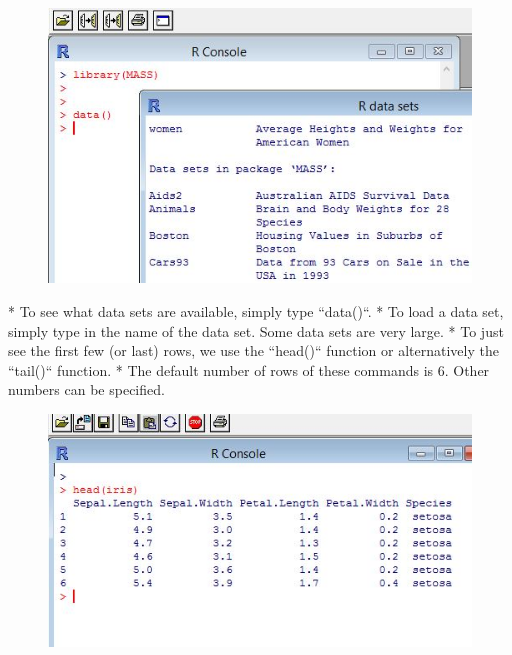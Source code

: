 \documentclass{beamer}
\begin{document}

\begin{figure}
\centering
\includegraphics[width=1.2\linewidth]{images/RdatasetsMore}   
\end{figure}
   



* To see what data sets are available, simply type ``data()``.
*  To load a data set, simply type in the
name of the data set. Some data sets are very large.
*  To just see the first few (or last) rows, we
use the ``head()`` function or alternatively the ``tail()`` function. 
* The default number of rows of
these commands is 6. Other numbers can be specified.




\begin{figure}
\centering 
\includegraphics[width=1.2\linewidth]{images/irishead}      
\end{figure}
   
\end{document}

